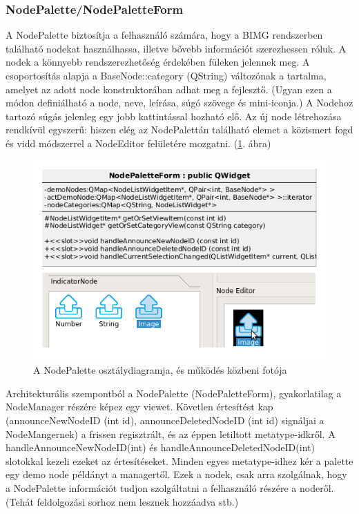 \documentclass[a4paper,12pt,oneside]{report}
\begin{document}
\subsubsection{NodePalette/NodePaletteForm}
A NodePalette biztosítja a felhasználó számára, hogy a BIMG rendszerben található nodekat használhassa, illetve bővebb információt szerezhessen róluk. A nodek a könnyebb rendszerezhetőség érdekében füleken jelennek meg. A csoportosítás alapja a BaseNode::category (QString) változónak a tartalma, amelyet az adott node konstruktorában adhat meg a fejlesztő. (Ugyan ezen a módon definiálható a node, neve, leírása, súgó szövege és mini-iconja.) A Nodehoz tartozó súgás jelenleg egy jobb kattintással hozható elő. Az új node létrehozása rendkívül egyszerű: hiszen elég az NodePalettán található elemet a közismert fogd és vidd módszerrel a NodeEditor felületére mozgatni. (\ref{fig:bimg_nodepalette}. ábra)
\begin{center}
\begin{figure}[h]
  \includegraphics[width=1\textwidth]{nodepalette.png}
  \caption{A NodePalette osztálydiagramja, és működés közbeni fotója }
  \label{fig:bimg_nodepalette}
\end{figure}
\end{center}

Architekturális szempontból a NodePalette (NodePaletteForm), gyakorlatilag a NodeManager részére képez egy viewet. Követlen értesítést kap (announceNewNodeID (int id), announceDeletedNodeID (int id) signáljai a NodeMangernek) a frissen regisztrált, és az éppen letiltott metatype-idkről. A handleAnnounceNewNodeID(int) és handleAnnounceDeletedNodeID(int) slotokkal kezeli ezeket az értesítéseket. Minden egyes metatype-idhez kér a palette egy demo node példányt a managertől. Ezek a nodek, csak arra szolgálnak, hogy a NodePalette információt tudjon szolgáltatni a felhasználó részére a noderől. (Tehát feldolgozási sorhoz nem lesznek hozzáadva stb.)
\end{document}
